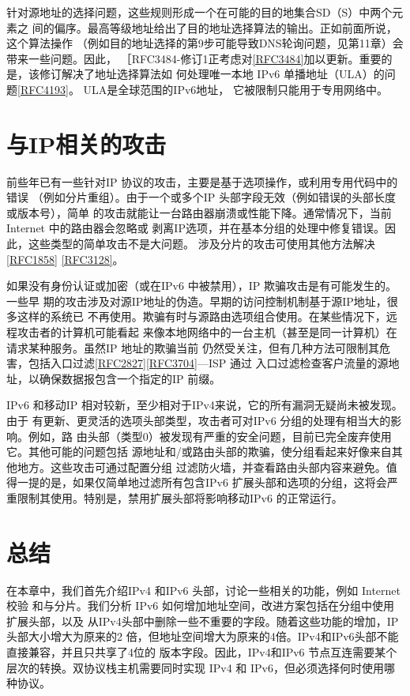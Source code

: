 针对源地址的选择问题，这些规则形成一个在可能的目的地集合SD（S）中两个元素之
间的偏序。最高等级地址给出了目的地址选择算法的输出。正如前面所说，这个算法操作
（例如目的地址选择的第9步可能导致DNS轮询问题，见第11章）会带来一些问题。因此，
［RFC3484-修订1正考虑对\href{https://www.rfc-editor.org/rfc/rfc3484}{[RFC3484]}加以更新。重要的是，该修订解决了地址选择算法如
何处理唯一本地 IPv6 单播地址（ULA）的问题\href{https://www.rfc-editor.org/rfc/rfc4193}{[RFC4193]}。 ULA是全球范围的IPv6地址，
它被限制只能用于专用网络中。

\section{与IP相关的攻击}

前些年已有一些针对IP 协议的攻击，主要是基于选项操作，或利用专用代码中的错误
（例如分片重组）。由于一个或多个IP 头部字段无效（例如错误的头部长度或版本号），简单
的攻击就能让一台路由器崩溃或性能下降。通常情况下，当前 Internet 中的路由器会忽略或
剥离IP选项，并在基本分组的处理中修复错误。因此，这些类型的简单攻击不是大问题。
涉及分片的攻击可使用其他方法解决\href{https://www.rfc-editor.org/rfc/rfc1858}{[RFC1858]} \href{https://www.rfc-editor.org/rfc/rfc3128}{[RFC3128]}。

如果没有身份认证或加密（或在IPv6 中被禁用），IP 欺骗攻击是有可能发生的。一些早
期的攻击涉及对源IP地址的伪造。早期的访问控制机制基于源IP地址，很多这样的系统已
不再使用。欺骗有时与源路由选项组合使用。在某些情况下，远程攻击者的计算机可能看起
来像本地网络中的一台主机（甚至是同一计算机）在请求某种服务。虽然IP 地址的欺骗当前
仍然受关注，但有几种方法可限制其危害，包括入口过滤\href{https://www.rfc-editor.org/rfc/rfc2827}{[RFC2827]}\href{https://www.rfc-editor.org/rfc/rfc3704}{[RFC3704]}—ISP 通过
入口过滤检查客户流量的源地址，以确保数据报包含一个指定的IP 前缀。

IPv6 和移动IP 相对较新，至少相对于IPv4来说，它的所有漏洞无疑尚未被发现。由于
有更新、更灵活的选项头部类型，攻击者可对IPv6 分组的处理有相当大的影响。例如，路
由头部（类型0）被发现有严重的安全问题，目前已完全废弃使用它。其他可能的问题包括
源地址和/或路由头部的欺骗，使分组看起来好像来自其他地方。这些攻击可通过配置分组
过滤防火墙，并查看路由头部内容来避免。值得一提的是，如果仅简单地过滤所有包含IPv6
扩展头部和选项的分组，这将会严重限制其使用。特别是，禁用扩展头部将影响移动IPv6
的正常运行。

\section{总结}
在本章中，我们首先介绍IPv4 和IPv6 头部，讨论一些相关的功能，例如 Internet 校验
和与分片。我们分析 IPv6 如何增加地址空间，改进方案包括在分组中使用扩展头部，以及
从IPv4头部中删除一些不重要的字段。随着这些功能的增加，IP 头部大小增大为原来的2
倍，但地址空间增大为原来的4倍。IPv4和IPv6头部不能直接兼容，并且只共享了4位的
版本字段。因此，IPv4和IPv6 节点互连需要某个层次的转换。双协议栈主机需要同时实现
IPv4 和 IPv6，但必须选择何时使用哪种协议。

